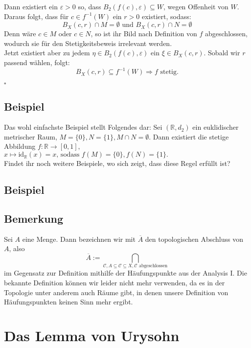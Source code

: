 \documentclass[11pt,leqno]{article}
\begin{document}
Dann existiert ein $\varepsilon > 0$ so, dass $B_2(f(c),\varepsilon) \subseteq W$, wegen Offenheit von $W$. \\
Daraus folgt, dass für $c \in f^{-1}(W)$ ein $r > 0$ existiert, sodass:
\[B_X(c,r) \cap M = \emptyset \text{ und } B_X(c,r) \cap N = \emptyset\]
Denn wäre $c \in M$ oder $c \in N$, so ist ihr Bild nach Definition von $f$ abgeschlossen, wodurch sie für den Stetigkeitsbeweis irrelevant 
werden. \\
Jetzt existiert aber zu jedem $\eta \in B_2(f(c), \varepsilon)$ ein $\xi \in B_X(c,r)$. Sobald wir $r$ passend wählen, folgt:
\[B_X(c,r) \subseteq f^{-1}(W) \Rightarrow f \text{ stetig.}\]
\begin{flushright} 
    $\square$ 
\end{flushright}

\subsection{Beispiel}
Das wohl einfachste Beispiel stellt Folgendes dar: Sei $(\mathbb{R}, d_2)$ ein euklidischer metrischer Raum, 
$M=\{0 \}, N=\{1\}, M \cap N = \emptyset. $
Dann existiert die stetige Abbildung $f: \mathbb{R} \xrightarrow{} [0,1],$ \\
$ x \mapsto \text{id}_{\mathbb{R}}(x)=x\text{, sodass } f(M)=\{0\}, f(N)= \{1\}.$ \\
Findet ihr noch weitere Beispiele, wo sich zeigt, dass diese Regel erfüllt ist?
\subsection{Beispiel}

\subsection{Bemerkung}
Sei $A$ eine Menge. Dann bezeichnen wir mit $\overline{A}$ den topologischen Abschluss von $A$, also 
\[\overline{A}:= \bigcap_{\mathcal{C}, A \subseteq \mathcal{C}\subseteq X, \mathcal{C} \text{ abgeschlossen}}  \]
im Gegensatz zur Definition mithilfe der Häufungspunkte aus der Analysis I. Die bekannte Definition können wir leider nicht mehr verwenden,
da es in der Topologie unter anderem auch Räume gibt, in denen unsere Definition von Häufungspunkten keinen Sinn mehr ergibt.

\section{Das Lemma von Urysohn}
\end{document}
